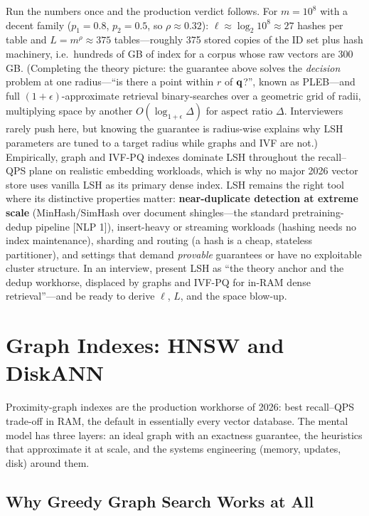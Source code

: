 Run the numbers once and the production verdict follows. For $m = 10^8$ with a decent family ($p_1 = 0.8$, $p_2 = 0.5$, so $\rho \approx 0.32$): $\ell \approx \log_2 10^8 \approx 27$ hashes per table and $L = m^{\rho} \approx 375$ tables---roughly 375 stored copies of the ID set plus hash machinery, i.e.\ hundreds of GB of index for a corpus whose raw vectors are 300\,GB. (Completing the theory picture: the guarantee above solves the \emph{decision} problem at one radius---``is there a point within $r$ of $\mathbf{q}$?'', known as PLEB---and full $(1{+}\epsilon)$-approximate retrieval binary-searches over a geometric grid of radii, multiplying space by another $O(\log_{1+\epsilon}\Delta)$ for aspect ratio $\Delta$. Interviewers rarely push here, but knowing the guarantee is radius-wise explains why LSH parameters are tuned to a target radius while graphs and IVF are not.) Empirically, graph and IVF-PQ indexes dominate LSH throughout the recall--QPS plane on realistic embedding workloads, which is why no major 2026 vector store uses vanilla LSH as its primary dense index. LSH remains the right tool where its distinctive properties matter: \textbf{near-duplicate detection at extreme scale} (MinHash/SimHash over document shingles---the standard pretraining-dedup pipeline [NLP 1]), insert-heavy or streaming workloads (hashing needs no index maintenance), sharding and routing (a hash is a cheap, stateless partitioner), and settings that demand \emph{provable} guarantees or have no exploitable cluster structure. In an interview, present LSH as ``the theory anchor and the dedup workhorse, displaced by graphs and IVF-PQ for in-RAM dense retrieval''---and be ready to derive $\ell$, $L$, and the space blow-up.

\section{Graph Indexes: HNSW and DiskANN}
\label{sr:sec:vr_graphs}

Proximity-graph indexes are the production workhorse of 2026: best recall--QPS trade-off in RAM, the default in essentially every vector database. The mental model has three layers: an ideal graph with an exactness guarantee, the heuristics that approximate it at scale, and the systems engineering (memory, updates, disk) around them.

\subsection{Why Greedy Graph Search Works at All}

